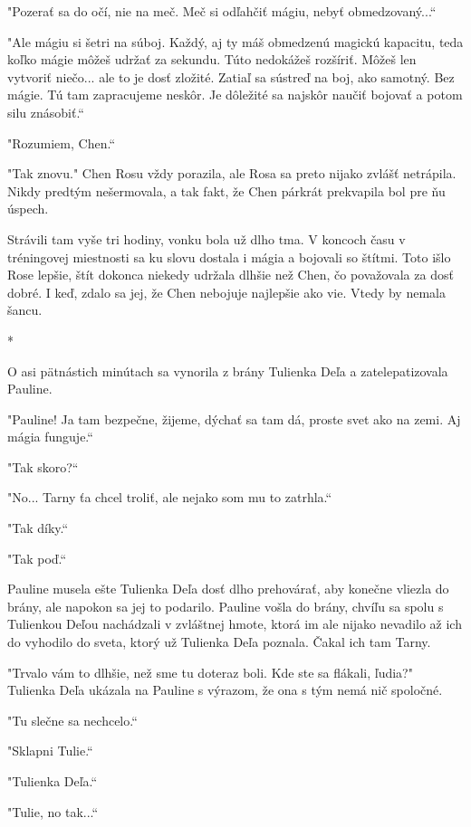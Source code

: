 \documentclass{book}
\begin{document}
"$ $Pozerať sa do očí, nie na meč. Meč si odľahčiť mágiu, nebyť obmedzovaný...“

"$ $Ale mágiu si šetri na súboj. Každý, aj ty máš obmedzenú magickú kapacitu, teda koľko mágie môžeš udržať za sekundu. Túto nedokážeš rozšíriť. Môžeš len vytvoriť niečo... ale to je dosť zložité. Zatiaľ sa sústreď na boj, ako samotný. Bez mágie. Tú tam zapracujeme neskôr. Je dôležité sa najskôr naučiť bojovať a potom silu znásobiť.“

"$ $Rozumiem, Chen.“

"$ $Tak znovu."$ $ Chen Rosu vždy porazila, ale Rosa sa preto nijako zvlášť netrápila. Nikdy predtým nešermovala, a tak fakt, že Chen párkrát prekvapila bol pre ňu úspech.

Strávili tam vyše tri hodiny, vonku bola už dlho tma. V koncoch času v tréningovej miestnosti sa ku slovu dostala i mágia a bojovali so štítmi. Toto išlo Rose lepšie, štít dokonca niekedy udržala dlhšie než Chen, čo považovala za dosť dobré. I keď, zdalo sa jej, že Chen nebojuje najlepšie ako vie. Vtedy by nemala šancu.

\begin{center}
*
\end{center}

O asi pätnástich minútach sa vynorila z brány Tulienka Deľa a zatelepatizovala Pauline.

"$ $Pauline! Ja tam bezpečne, žijeme, dýchať sa tam dá, proste svet ako na zemi. Aj mágia funguje.“

"$ $Tak skoro?“

"$ $No... Tarny ťa chcel troliť, ale nejako som mu to zatrhla.“

"$ $Tak díky.“

"$ $Tak poď.“

Pauline musela ešte Tulienka Deľa dosť dlho prehovárať, aby konečne vliezla do brány, ale napokon sa jej to podarilo. Pauline vošla do brány, chvíľu sa spolu s Tulienkou Deľou nachádzali v zvláštnej hmote, ktorá im ale nijako nevadilo až ich do vyhodilo do sveta, ktorý už Tulienka Deľa poznala. Čakal ich tam Tarny.

"$ $Trvalo vám to dlhšie, než sme tu doteraz boli. Kde ste sa flákali, ľudia?"$ $ Tulienka Deľa ukázala na Pauline s výrazom, že ona s tým nemá nič spoločné.

"$ $Tu slečne sa nechcelo.“

"$ $Sklapni Tulie.“

"$ $Tulienka Deľa.“

"$ $Tulie, no tak...“
\end{document}
